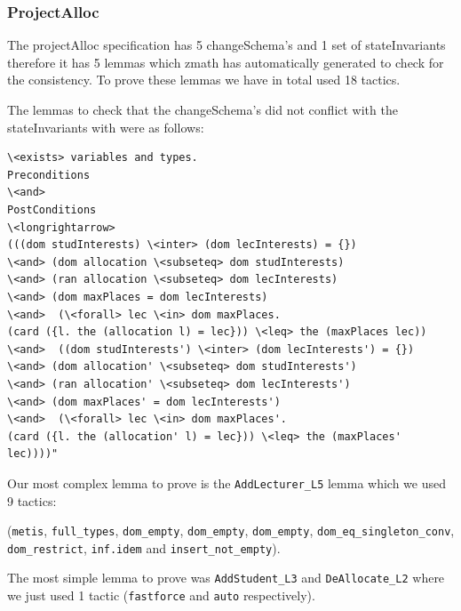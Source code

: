 \subsubsection{ProjectAlloc}

The projectAlloc specification has 5 changeSchema's and 1 set of stateInvariants
therefore it has 5 lemmas which \gls{zmath} has automatically generated to check
for the consistency. To prove these lemmas we have in total used 18 tactics.

The lemmas to check that the changeSchema's did not conflict with
the stateInvariants with were as follows:

\begin{verbatim}
\<exists> variables and types.
Preconditions
\<and>
PostConditions
\<longrightarrow>
(((dom studInterests) \<inter> (dom lecInterests) = {})
\<and> (dom allocation \<subseteq> dom studInterests)
\<and> (ran allocation \<subseteq> dom lecInterests)
\<and> (dom maxPlaces = dom lecInterests)
\<and>  (\<forall> lec \<in> dom maxPlaces.
(card ({l. the (allocation l) = lec})) \<leq> the (maxPlaces lec))
\<and>  ((dom studInterests') \<inter> (dom lecInterests') = {})
\<and> (dom allocation' \<subseteq> dom studInterests')
\<and> (ran allocation' \<subseteq> dom lecInterests')
\<and> (dom maxPlaces' = dom lecInterests')
\<and>  (\<forall> lec \<in> dom maxPlaces'.
(card ({l. the (allocation' l) = lec})) \<leq> the (maxPlaces' lec))))"
\end{verbatim}

Our most complex lemma to prove is the \verb|AddLecturer_L5| lemma which we used
9 tactics:

(\verb|metis|, \verb|full_types|, \verb|dom_empty|, \verb|dom_empty|,
\verb|dom_empty|, \verb|dom_eq_singleton_conv|, \verb|dom_restrict|,
\verb|inf.idem| and \verb|insert_not_empty|).

The most simple lemma to prove was \verb|AddStudent_L3| and \verb|DeAllocate_L2|
where we just used 1 tactic (\verb|fastforce| and \verb|auto| respectively).

